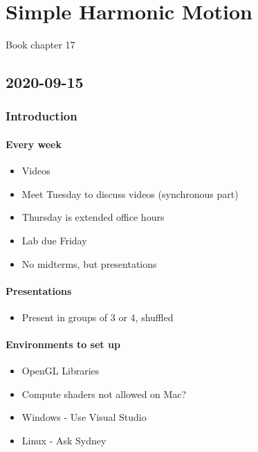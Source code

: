 \chapter{Simple Harmonic Motion}

Book chapter 17

\section{2020-09-15}

\subsection{Introduction}

\subsubsection{Every week}

\begin{itemize}
    \item Videos
    \item Meet Tuesday to discuss videos (synchronous part)
    \item Thursday is extended office hours
    \item Lab due Friday
    \item No midterms, but presentations
\end{itemize}

\subsubsection{Presentations}

\begin{itemize}
    \item Present in groups of 3 or 4, shuffled
\end{itemize}

\subsubsection{Environments to set up}

\begin{itemize}
    \item OpenGL Libraries
    \item Compute shaders not allowed on Mac?
    \item Windows - Use Visual Studio
    \item Linux - Ask Sydney
\end{itemize}

